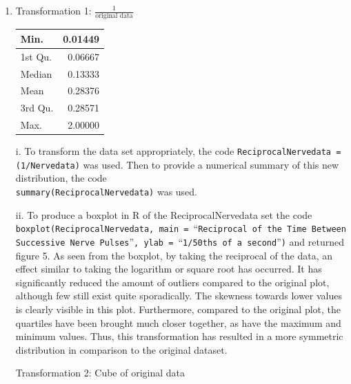 \documentclass[a4paper]{article}
\newcommand{\ds}{\displaystyle}
\newcommand{\code}{\texttt}
\begin{document}
\begin{enumerate}
\begin{enumerate}
		\item Transformation 1: $\ds{\frac{1}{\text{original data}}}$
		\bigbreak
		\begin{adjustbox}{valign=T,raise=0ex,minipage={\linewidth}}
	        \begin{table}
				\begin{tabular}{l|r}
					Min. & 0.01449 \\
					\hline
					1st Qu. & 0.06667 \\
					\hline
					Median & 0.13333 \\
					\hline
					Mean & 0.28376 \\
					\hline
					3rd Qu. & 0.28571 \\
					\hline
					Max. & 2.00000 \\
				\end{tabular}
			\end{table}

    		i. To transform the data set appropriately, the code \code{ReciprocalNervedata = (1/Nervedata)} was used. Then to provide a numerical summary of this new distribution, the code \\ \code{summary(ReciprocalNervedata)} was used.

    		\bigbreak

			ii. To produce a boxplot in R of the ReciprocalNervedata set the code \code{boxplot(ReciprocalNervedata, main = }\enquote{\code{Reciprocal of the Time Between Successive Nerve Pulses}}\code{, ylab = }\enquote{\code{1/50ths of a second}}\code{)} and returned figure 5. As seen from the boxplot, by taking the reciprocal of the data, an effect similar to taking the logarithm or square root has occurred. It has significantly reduced the amount of outliers compared to the original plot, although few still exist quite sporadically. The skewness towards lower values is clearly visible in this plot. Furthermore, compared to the original plot, the quartiles have been brought much closer together, as have the maximum and minimum values. Thus, this transformation has resulted in a more symmetric distribution in comparison to the original dataset.

	    \end{adjustbox}

	    \pagebreak

		Transformation 2: Cube of original data
		\bigbreak
		

\end{enumerate}
\end{enumerate}
\end{document}
